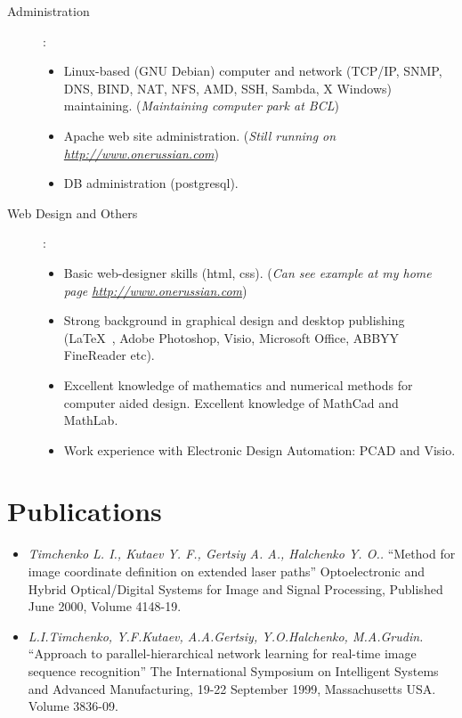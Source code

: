 \documentclass[10pt, overlapped, line]{res}
\newcommand{\wdescription}[1]{({\small \it #1})}
\newcommand{\mtitle}[1]{``#1''}
\newcommand{\mauthors}[1]{ {\it #1. }}
\newcommand{\mwhere}[1]{ #1. }
\begin{document}
\begin{resume}
\begin{description}
   \item[Administration]:\\ 
     \begin{itemize}
     \item Linux-based (GNU Debian) computer and network (TCP/IP,
       SNMP, DNS, BIND, NAT, NFS, AMD, SSH, Sambda, X Windows) maintaining. 
       \wdescription{Maintaining computer park at BCL}
     \item Apache web site administration.
       \wdescription{Still running on \href{URL}{http://www.onerussian.com}}
     \item DB administration (postgresql).
     \end{itemize}

   \item[Web Design and Others]:\\
     \begin{itemize}
     \item Basic web-designer skills (html, css).
       \wdescription{Can see example at my home page \href{URL}{http://www.onerussian.com}}
     \item Strong background in graphical design and desktop
       publishing (\LaTeX\ , Adobe Photoshop, Visio, Microsoft Office, ABBYY
       FineReader etc).
     \item Excellent knowledge of mathematics and numerical methods
       for computer aided design. Excellent knowledge of MathCad and
       MathLab.
     \item Work experience with Electronic Design Automation: PCAD and
       Visio.
     \end{itemize}
 \end{description}

\section{Publications}

\begin{itemize}
 
 \item 
    \mauthors{Timchenko L. I., Kutaev Y. F., Gertsiy A. A., Halchenko Y. O.}
    \mtitle{Method for image coordinate definition on extended laser paths} 
    \mwhere{Optoelectronic and Hybrid Optical/Digital Systems for Image and Signal Processing, Published June 2000,  Volume 4148-19}

 \item 
    \mauthors{L.I.Timchenko, Y.F.Kutaev, A.A.Gertsiy, Y.O.Halchenko, M.A.Grudin} 
    \mtitle{Approach to parallel-hierarchical network learning for real-time image sequence recognition} 
    \mwhere{The International Symposium on Intelligent Systems and Advanced Manufacturing, 19-22 September 1999, Massachusetts USA. Volume 3836-09}


\end{itemize}
\end{resume}
\end{document}
